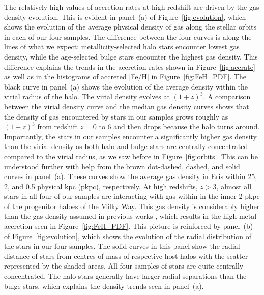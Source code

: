 \documentclass[a4paper,fleqn,usenatbib]{mnras}
\begin{document}
The relatively high values of accretion rates at high redshift are
driven by the gas density evolution.  This is evident in panel~(a) of
Figure~\ref{fig:evolution}, which shows the evolution of the average
physical density of gas along the stellar orbits in each of our four
samples.  The difference between the four curves is along the lines of
what we expect: metallicity-selected halo stars encounter lowest gas
density, while the age-selected bulge stars encounter the highest gas
density.  This difference explains the trends in the accretion rates
shown in Figure~\ref{fig:accrate} as well as in the histograms of
accreted [Fe/H] in Figure~\ref{fig:FeH_PDF}.  The black curve in
panel~(a) shows the evolution of the average density within the virial
radius of the halo.  The virial density evolves at $(1+z)^3$.  A
comparison between the virial density curve and the median gas density
curves shows that the density of gas encountered by stars in our
samples grows roughly as $(1+z)^3$ from redshift $z=0$ to $6$ and then
drops because the halo turns around.  Importantly, the stars in our
samples encounter a significantly higher gas density than the virial
density as both halo and bulge stars are centrally concentrated
compared to the virial radius, as we saw before in
Figure~\ref{fig:orbits}.  This can be understood further with help
from the brown dot-dashed, dashed, and solid curves in panel~(a).
These curves show the average gas density in Eris within 25, 2, and
0.5 physical kpc (pkpc), respectively.  At high redshifts, $z>3$,
almost all stars in all four of our samples are interacting with gas
within in the inner 2 pkpc of the progenitor haloes of the Milky Way.
This gas density is considerably higher than the gas density assumed
in previous works \citep[cf.][]{2009MNRAS.392L..50F,
  2011MNRAS.413.1184J}, which results in the high metal accretion seen
in Figure~\ref{fig:FeH_PDF}.  This picture is reinforced by panel~(b)
of Figure~\ref{fig:evolution}, which shows the evolution of the radial
distribution of the stars in our four samples.  The solid curves in
this panel show the radial distance of stars from centres of mass of
respective host halos with the scatter represented by the shaded
areas.  All four samples of stars are quite centrally concentrated.
The halo stars generally have larger radial separations than the bulge
stars, which explains the density trends seen in panel~(a).
\end{document}
